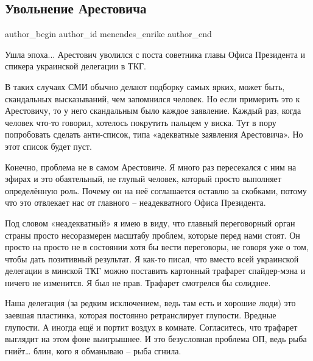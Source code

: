  
 
 
 
 
 
\subsection{Увольнение Арестовича}
\label{sec:18_01_2022.fb.menendes_enrike.1.arestovich}
 
\ifcmt
 author_begin
   author_id menendes_enrike
 author_end
\fi

Ушла эпоха... Арестович уволился с поста советника главы Офиса Президента и
спикера украинской делегации в ТКГ.

В таких случаях СМИ обычно делают подборку самых ярких, может быть, скандальных
высказываний, чем запомнился человек. Но если примерить это к Арестовичу, то у
него скандальным было каждое заявление. Каждый раз, когда человек что-то
говорил, хотелось покрутить пальцем у виска. Тут в пору попробовать сделать
анти-список, типа «адекватные заявления Арестовича». Но этот список будет пуст.

Конечно, проблема не в самом Арестовиче. Я много раз пересекался с ним на
эфирах и это обаятельный, не глупый человек, который просто выполняет
определённую роль. Почему он на неё соглашается оставлю за скобками, потому что
это отвлекает нас от главного – неадекватного Офиса Президента. 

Под словом «неадекватный» я имею в виду, что главный переговорный орган страны
просто несоразмерен масштабу проблем, которые перед нами стоят. Он просто на
просто не в состоянии хотя бы вести переговоры, не говоря уже о том, чтобы дать
позитивный результат. Я как-то писал, что вместо всей украинской делегации в
минской ТКГ можно поставить картонный трафарет спайдер-мэна и ничего не
изменится. Я был не прав. Трафарет смотрелся бы солиднее.

Наша делегация (за редким исключением, ведь там есть и хорошие люди) это
заевшая пластинка, которая постоянно ретранслирует глупости. Вредные глупости.
А иногда ещё и портит воздух в комнате. Согласитесь, что трафарет выглядит на
этом фоне выигрышнее. И это безусловная проблема ОП, ведь рыба гниёт… блин,
кого я обманываю – рыба сгнила.

